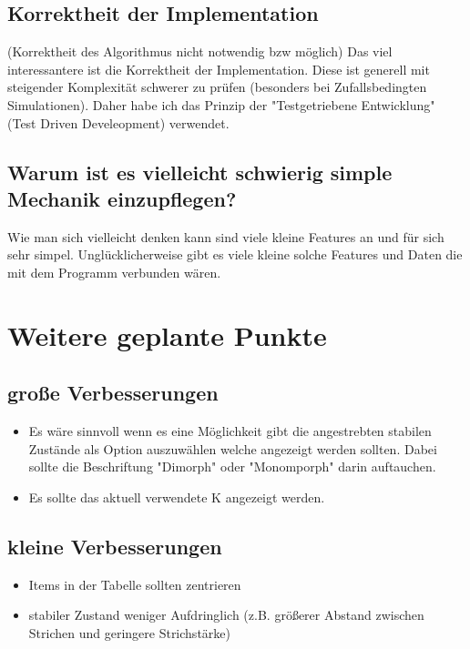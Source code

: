 \documentclass{article}
\begin{document}
	\subsection{Korrektheit der Implementation}
	(Korrektheit des Algorithmus nicht notwendig bzw möglich)
	Das viel interessantere ist die Korrektheit der Implementation. Diese ist generell mit steigender Komplexität schwerer zu prüfen (besonders bei Zufallsbedingten Simulationen).
	Daher habe ich das Prinzip der "{}Testgetriebene Entwicklung"{}  (Test Driven Develeopment) verwendet.
	
	\subsection{Warum ist es vielleicht schwierig simple Mechanik einzupflegen?}
	Wie man sich vielleicht denken kann sind viele kleine Features an und für sich sehr simpel.
	Unglücklicherweise gibt es viele kleine solche Features und Daten die mit dem Programm verbunden wären. 

\newpage
\section{Weitere geplante Punkte}
\subsection{große Verbesserungen}
\begin{itemize}
\item 	Es wäre sinnvoll wenn es eine Möglichkeit gibt die angestrebten stabilen Zustände als Option auszuwählen welche angezeigt werden sollten. Dabei sollte die Beschriftung "{}Dimorph"{} oder "{}Monomporph"{} darin auftauchen.
\item Es sollte das aktuell verwendete K angezeigt werden.
\end{itemize}

\subsection{kleine Verbesserungen}
\begin{itemize}
\item Items in der Tabelle sollten zentrieren
\item stabiler Zustand weniger Aufdringlich (z.B. größerer Abstand zwischen Strichen und geringere Strichstärke)
\end{itemize}
\end{document}
